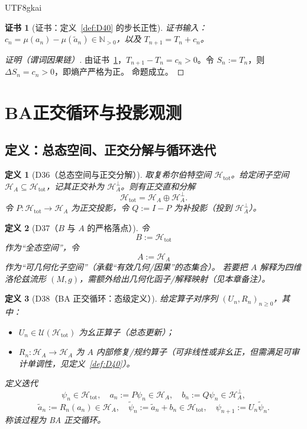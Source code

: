 \documentclass[12pt]{article}
\newtheorem{definition}{定义}[section]
\newtheorem{Certificate}{证书}[section]
\begin{document}
\begin{CJK*}{UTF8}{gkai}
\begin{Certificate}[证书：定义~\ref{def:D40} 的步长正性]
\label{cert:P19}
证书输入：$c_n=\mu(a_n)-\mu(\tilde a_n)\in\mathbb N_{>0}$，以及 $T_{n+1}=T_n+c_n$。
\end{Certificate}

\begin{proof}[证明（谓词因果链）]
由证书~\ref{cert:P19}，$T_{n+1}-T_n=c_n>0$。令 $S_n:=T_n$，则 $\Delta S_n=c_n>0$，即熵产严格为正。
命题成立。
\end{proof}

\clearpage
\section{BA正交循环与投影观测}
\label{sec:ba-orthogonal-cycle}

\subsection{定义：总态空间、正交分解与循环迭代}

\begin{definition}[D36（总态空间与正交分解）]
\label{def:D36}
取复希尔伯特空间 $\mathcal H_{\mathrm{tot}}$。给定闭子空间 $\mathcal H_A\subseteq \mathcal H_{\mathrm{tot}}$，记其正交补为 $\mathcal
  H_A^\perp$。则有正交直和分解
\[
\mathcal H_{\mathrm{tot}}=\mathcal H_A\oplus \mathcal H_A^\perp.
\]
令 $P:\mathcal H_{\mathrm{tot}}\to\mathcal H_A$ 为正交投影，令 $Q:=I-P$ 为补投影（投到 $\mathcal H_A^\perp$）。
\end{definition}

\begin{definition}[D37（$B$ 与 $A$ 的严格落点）]
\label{def:D37}
令
\[
B:=\mathcal H_{\mathrm{tot}}
\]
作为“全态空间”，令
\[
A:=\mathcal H_A
\]
作为“可几何化子空间”（承载“有效几何/因果”的态集合）。
若要把 $A$ 解释为四维洛伦兹流形 $(M,g)$，需额外给出几何化函子/解释映射（见本章备注）。
\end{definition}

\begin{definition}[D38（BA 正交循环：态级定义）]
\label{def:D38}
给定算子对序列 $(U_n,R_n)_{n\ge 0}$，其中：
\begin{itemize}
\item $U_n\in\mathcal U(\mathcal H_{\mathrm{tot}})$ 为幺正算子（总态更新）；
\item $R_n:\mathcal H_A\to\mathcal H_A$ 为 $A$ 内部修复/规约算子（可非线性或非幺正，但需满足可审计单调性，见定义~\ref{def:D40}）。
\end{itemize}
定义迭代
\[
\psi_n\in\mathcal H_{\mathrm{tot}},\quad
a_n:=P\psi_n\in\mathcal H_A,\quad
b_n:=Q\psi_n\in\mathcal H_A^\perp,
\]
\[
\tilde a_n:=R_n(a_n)\in\mathcal H_A,\quad
\tilde\psi_n:=\tilde a_n+b_n\in\mathcal H_{\mathrm{tot}},
\quad
\psi_{n+1}:=U_n\tilde\psi_n.
\]
称该过程为 BA 正交循环。
\end{definition}


\end{CJK*}
\end{document}
